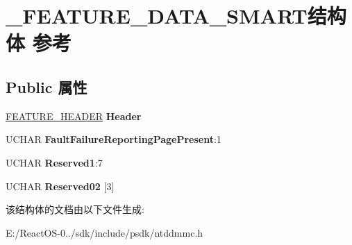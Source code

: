 \hypertarget{struct___f_e_a_t_u_r_e___d_a_t_a___s_m_a_r_t}{}\section{\+\_\+\+F\+E\+A\+T\+U\+R\+E\+\_\+\+D\+A\+T\+A\+\_\+\+S\+M\+A\+R\+T结构体 参考}
\label{struct___f_e_a_t_u_r_e___d_a_t_a___s_m_a_r_t}
\subsection*{Public 属性}
\begin{DoxyCompactItemize}
\item 
\mbox{\label{struct___f_e_a_t_u_r_e___d_a_t_a___s_m_a_r_t_a496de4e6125a7774f2e6e148509b96ec}} 
\hyperlink{struct___f_e_a_t_u_r_e___h_e_a_d_e_r}{F\+E\+A\+T\+U\+R\+E\+\_\+\+H\+E\+A\+D\+ER} {\bfseries Header}
\item 
\mbox{\label{struct___f_e_a_t_u_r_e___d_a_t_a___s_m_a_r_t_aefcfc97dd8e0bcec86a53830041b50d2}} 
U\+C\+H\+AR {\bfseries Fault\+Failure\+Reporting\+Page\+Present}\+:1
\item 
\mbox{\label{struct___f_e_a_t_u_r_e___d_a_t_a___s_m_a_r_t_ad99180d476a3af3078a9c2a0a3448707}} 
U\+C\+H\+AR {\bfseries Reserved1}\+:7
\item 
\mbox{\label{struct___f_e_a_t_u_r_e___d_a_t_a___s_m_a_r_t_a0025af7df413ba6640c23255baf7b2e4}} 
U\+C\+H\+AR {\bfseries Reserved02} \mbox{[}3\mbox{]}
\end{DoxyCompactItemize}


该结构体的文档由以下文件生成\+:\begin{DoxyCompactItemize}
\item 
E\+:/\+React\+O\+S-\/0../sdk/include/psdk/ntddmmc.\+h\end{DoxyCompactItemize}
